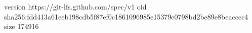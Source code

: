 version https://git-lfs.github.com/spec/v1
oid sha256:fdd413a61eeb198cdb5f87ef0c1861096985e15379e0798bd2be89e8beacccc4
size 174916
